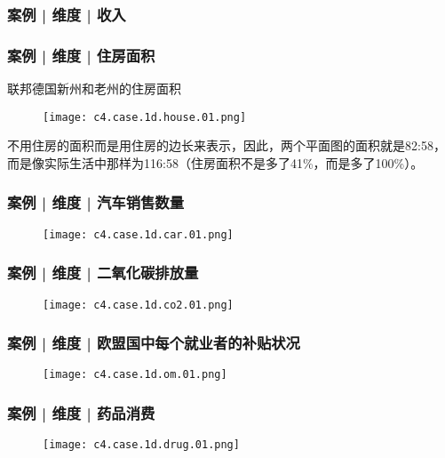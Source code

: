 \begin{frame}
  \frametitle{案例 | 维度 | 收入}
  \begin{figure}
    \centering
  \end{figure}
\end{frame}

\begin{frame}
  \frametitle{案例 | 维度 | 住房面积}
  \begin{block}{联邦德国新州和老州的住房面积}
    \begin{figure}
      \centering
      \texttt{[image: c4.case.1d.house.01.png]}
    \end{figure}
    \vspace{-0.5em}
    不用住房的面积而是用住房的边长来表示，因此，两个平面图的面积就是82:58，而是像实际生活中那样为116:58（住房面积不是多了41\%，而是多了100\%）。
  \end{block}
\end{frame}

\begin{frame}
  \frametitle{案例 | 维度 | 汽车销售数量}
  \begin{figure}
    \centering
    \texttt{[image: c4.case.1d.car.01.png]}
  \end{figure}
\end{frame}

\begin{frame}
  \frametitle{案例 | 维度 | 二氧化碳排放量}
  \begin{figure}
    \centering
    \texttt{[image: c4.case.1d.co2.01.png]}
  \end{figure}
\end{frame}

\begin{frame}
  \frametitle{案例 | 维度 | 欧盟国中每个就业者的补贴状况}
  \begin{figure}
    \centering
    \texttt{[image: c4.case.1d.om.01.png]}
  \end{figure}
\end{frame}

\begin{frame}
  \frametitle{案例 | 维度 | 药品消费}
  \begin{figure}
    \centering
    \texttt{[image: c4.case.1d.drug.01.png]}
  \end{figure}
\end{frame}

